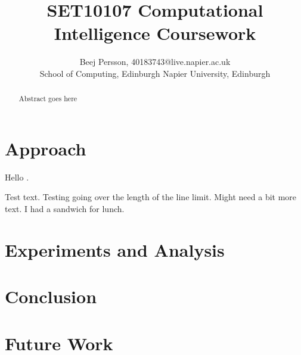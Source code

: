 \documentclass[sigconf]{acmart}
\begin{document}
\title{SET10107 Computational Intelligence Coursework}

\author{Beej Persson, 40183743@live.napier.ac.uk\\School of Computing, Edinburgh Napier University, Edinburgh}



\begin{abstract}
Abstract goes here
\end{abstract}





\maketitle

\section{Approach}
Hello \cite{meyer}.

Test text. Testing going over the length of the line limit. Might need a bit more text. I had a sandwich for lunch.
\section{Experiments and Analysis}
\section{Conclusion}
\section{Future Work}


 
\end{document}
